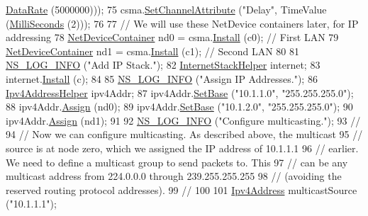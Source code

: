 \begin{DoxyCode}
      \hyperlink{classns3_1_1DataRate}{DataRate} (5000000)));
75   csma.\hyperlink{classns3_1_1CsmaHelper_a886d900b2fe44433e0b81752dea7e7f1}{SetChannelAttribute} (\textcolor{stringliteral}{"Delay"}, TimeValue (\hyperlink{group__timecivil_gaf26127cf4571146b83a92ee18679c7a9}{MilliSeconds} (2)));
76  
77   \textcolor{comment}{// We will use these NetDevice containers later, for IP addressing}
78   \hyperlink{classns3_1_1NetDeviceContainer}{NetDeviceContainer} nd0 = csma.\hyperlink{classns3_1_1CsmaHelper_af79a91372595230b0817200270ab84e7}{Install} (c0);  \textcolor{comment}{// First LAN}
79   \hyperlink{classns3_1_1NetDeviceContainer}{NetDeviceContainer} nd1 = csma.\hyperlink{classns3_1_1CsmaHelper_af79a91372595230b0817200270ab84e7}{Install} (c1);  \textcolor{comment}{// Second LAN}
80 
81   \hyperlink{group__logging_gafbd73ee2cf9f26b319f49086d8e860fb}{NS\_LOG\_INFO} (\textcolor{stringliteral}{"Add IP Stack."});
82   \hyperlink{classns3_1_1InternetStackHelper}{InternetStackHelper} internet;
83   internet.\hyperlink{classns3_1_1InternetStackHelper_a6645b412f31283d2d9bc3d8a95cebbc0}{Install} (c);
84 
85   \hyperlink{group__logging_gafbd73ee2cf9f26b319f49086d8e860fb}{NS\_LOG\_INFO} (\textcolor{stringliteral}{"Assign IP Addresses."});
86   \hyperlink{classns3_1_1Ipv4AddressHelper}{Ipv4AddressHelper} ipv4Addr;
87   ipv4Addr.\hyperlink{classns3_1_1Ipv4AddressHelper_acf7b16dd25bac67e00f5e25f90a9a035}{SetBase} (\textcolor{stringliteral}{"10.1.1.0"}, \textcolor{stringliteral}{"255.255.255.0"});
88   ipv4Addr.\hyperlink{classns3_1_1Ipv4AddressHelper_af8e7f4a1a7e74c00014a1eac445a27af}{Assign} (nd0);
89   ipv4Addr.\hyperlink{classns3_1_1Ipv4AddressHelper_acf7b16dd25bac67e00f5e25f90a9a035}{SetBase} (\textcolor{stringliteral}{"10.1.2.0"}, \textcolor{stringliteral}{"255.255.255.0"});
90   ipv4Addr.\hyperlink{classns3_1_1Ipv4AddressHelper_af8e7f4a1a7e74c00014a1eac445a27af}{Assign} (nd1);
91 
92   \hyperlink{group__logging_gafbd73ee2cf9f26b319f49086d8e860fb}{NS\_LOG\_INFO} (\textcolor{stringliteral}{"Configure multicasting."});
93   \textcolor{comment}{//}
94   \textcolor{comment}{// Now we can configure multicasting.  As described above, the multicast }
95   \textcolor{comment}{// source is at node zero, which we assigned the IP address of 10.1.1.1 }
96   \textcolor{comment}{// earlier.  We need to define a multicast group to send packets to.  This}
97   \textcolor{comment}{// can be any multicast address from 224.0.0.0 through 239.255.255.255}
98   \textcolor{comment}{// (avoiding the reserved routing protocol addresses).}
99   \textcolor{comment}{//}
100 
101   \hyperlink{classns3_1_1Ipv4Address}{Ipv4Address} multicastSource (\textcolor{stringliteral}{"10.1.1.1"});

\end{DoxyCode}
